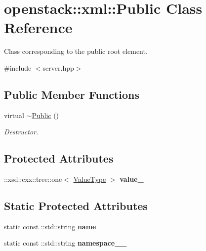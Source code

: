 \hypertarget{classopenstack_1_1xml_1_1Public}{
\section{openstack::xml::Public Class Reference}
\label{classopenstack_1_1xml_1_1Public}
}


Class corresponding to the public root element.  




{\ttfamily \#include $<$server.hpp$>$}

\subsection*{Public Member Functions}
\begin{DoxyCompactItemize}
\item 
\hypertarget{classopenstack_1_1xml_1_1Public_a10171ded6972f44ffaedf816d5f8cece}{
virtual \hyperlink{classopenstack_1_1xml_1_1Public_a10171ded6972f44ffaedf816d5f8cece}{$\sim$Public} ()}
\label{classopenstack_1_1xml_1_1Public_a10171ded6972f44ffaedf816d5f8cece}

\begin{DoxyCompactList}\small\item\em Destructor. \item\end{DoxyCompactList}\end{DoxyCompactItemize}
\subsection*{Protected Attributes}
\begin{DoxyCompactItemize}
\item 
\hypertarget{classopenstack_1_1xml_1_1Public_a2e93c351665bdd6d5b8f263319156e06}{
::xsd::cxx::tree::one$<$ \hyperlink{classopenstack_1_1xml_1_1AddressList}{ValueType} $>$ {\bfseries value\_\-}}
\label{classopenstack_1_1xml_1_1Public_a2e93c351665bdd6d5b8f263319156e06}

\end{DoxyCompactItemize}
\subsection*{Static Protected Attributes}
\begin{DoxyCompactItemize}
\item 
\hypertarget{classopenstack_1_1xml_1_1Public_a098fac121297c045e000870bb7ce2569}{
static const ::std::string {\bfseries name\_\-}}
\label{classopenstack_1_1xml_1_1Public_a098fac121297c045e000870bb7ce2569}

\item 
\hypertarget{classopenstack_1_1xml_1_1Public_a2549f86ec9aeceb9e87d15dad3c97557}{
static const ::std::string {\bfseries namespace\_\-\_\-}}
\label{classopenstack_1_1xml_1_1Public_a2549f86ec9aeceb9e87d15dad3c97557}

\end{DoxyCompactItemize}
